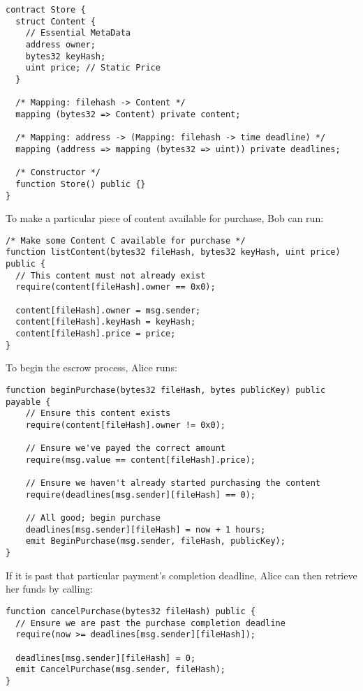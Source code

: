 \documentclass[12pt,oneside]{amsart}
\begin{document}
\begin{Verbatim}[fontsize=\tiny, frame=single]
contract Store {
  struct Content {
    // Essential MetaData
    address owner;
    bytes32 keyHash;
    uint price; // Static Price
  }

  /* Mapping: filehash -> Content */
  mapping (bytes32 => Content) private content;

  /* Mapping: address -> (Mapping: filehash -> time deadline) */
  mapping (address => mapping (bytes32 => uint)) private deadlines;

  /* Constructor */
  function Store() public {}
}
\end{Verbatim}

To make a particular piece of content available for purchase, Bob can run:

\begin{Verbatim}[fontsize=\tiny, frame=single]
/* Make some Content C available for purchase */
function listContent(bytes32 fileHash, bytes32 keyHash, uint price) public {
  // This content must not already exist
  require(content[fileHash].owner == 0x0);

  content[fileHash].owner = msg.sender;
  content[fileHash].keyHash = keyHash;
  content[fileHash].price = price;
}
\end{Verbatim}

To begin the escrow process, Alice runs:

\begin{Verbatim}[fontsize=\tiny, frame=single]
function beginPurchase(bytes32 fileHash, bytes publicKey) public payable {
    // Ensure this content exists
    require(content[fileHash].owner != 0x0);

    // Ensure we've payed the correct amount
    require(msg.value == content[fileHash].price);

    // Ensure we haven't already started purchasing the content
    require(deadlines[msg.sender][fileHash] == 0);

    // All good; begin purchase
    deadlines[msg.sender][fileHash] = now + 1 hours;
    emit BeginPurchase(msg.sender, fileHash, publicKey);
}
\end{Verbatim}

If it is past that particular payment's completion deadline, Alice can then retrieve her funds by calling:

\begin{Verbatim}[fontsize=\tiny, frame=single]
function cancelPurchase(bytes32 fileHash) public {
  // Ensure we are past the purchase completion deadline
  require(now >= deadlines[msg.sender][fileHash]);

  deadlines[msg.sender][fileHash] = 0;
  emit CancelPurchase(msg.sender, fileHash);
}
\end{Verbatim}
\end{document}
